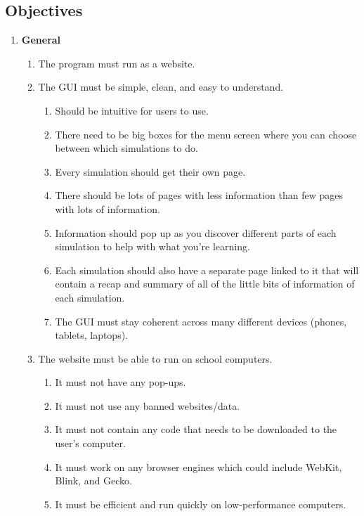 \documentclass[12pt]{article}
\begin{document}
\subsection{Objectives}
\begin{enumerate}[label=\textbf{\arabic*}.]
    \item \textbf{General}
    \begin{enumerate}[label*=\textbf{\arabic*}.]
        \item The program must run as a website.
        \item The GUI must be simple, clean, and easy to understand.
        \begin{enumerate}[label*=\textbf{\arabic*}.]
            \item Should be intuitive for users to use.
            \item There need to be big boxes for the menu screen where you can choose between which simulations to do.
            \item Every simulation should get their own page.
            \item There should be lots of pages with less information than few pages with lots of information.
            \item Information should pop up as you discover different parts of each simulation to help with what you're learning.
            \item Each simulation should also have a separate page linked to it that will contain a recap and summary of all of the little bits of information of each simulation.
            \item The GUI must stay coherent across many different devices (phones, tablets, laptops).
        \end{enumerate}
        \item The website must be able to run on school computers.
        \begin{enumerate}[label*=\textbf{\arabic*}.]
            \item It must not have any pop-ups.
            \item It must not use any banned websites/data.
            \item It must not contain any code that needs to be downloaded to the user's computer.
            \item It must work on any browser engines which could include WebKit, Blink, and Gecko.
            \item It must be efficient and run quickly on low-performance computers.

\end{enumerate}
\end{enumerate}
\end{enumerate}
\end{document}
